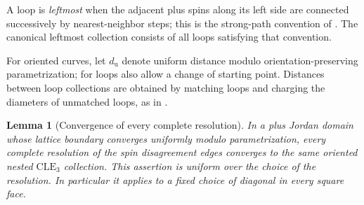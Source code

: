 \documentclass[11pt]{article}
\newtheorem{lemma}[theorem]{Lemma}
\theoremstyle{definition}
\theoremstyle{remark}
\numberwithin{equation}{section}
\begin{document}
A loop is \emph{leftmost} when the adjacent plus spins along its left
side are connected successively by nearest-neighbor steps; this is the
strong-path convention of \cite[Section~2.5]{BH2019}. The canonical
leftmost collection consists of all loops satisfying that convention.

For oriented curves, let $d_{\mathrm{u}}$ denote uniform distance modulo
orientation-preserving parametrization; for loops also allow a change
of starting point.  Distances between loop collections are obtained by
matching loops and charging the diameters of unmatched loops, as in
\cite[Section~2.7]{BH2019}.

\begin{lemma}[Convergence of every complete resolution]
\label{if:resolution-convergence}
In a plus Jordan domain whose lattice boundary converges uniformly
modulo parametrization, every complete resolution of the spin
disagreement edges converges to the same oriented nested
$\mathrm{CLE}_3$ collection.  This assertion is uniform over the choice
of the resolution.  In particular it applies to a fixed choice of
diagonal in every square face.
\end{lemma}
\end{document}
